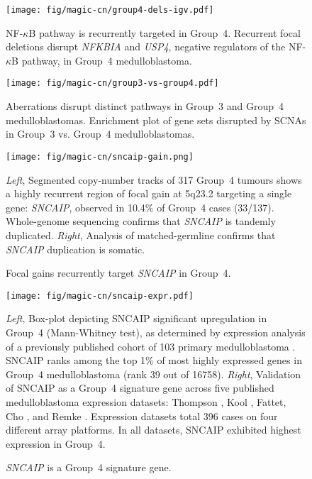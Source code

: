 \documentclass[11pt,letterpaper]{article}
\theoremstyle{definition}
\begin{document}
\clearpage

\begin{SCfigure}[2.0]
	\centering
	\texttt{[image: fig/magic-cn/group4-dels-igv.pdf]}
	\caption{NF-$\kappa$B pathway is recurrently targeted in Group~4.
		Recurrent focal deletions disrupt \emph{NFKBIA} and \emph{USP4}, negative regulators of the NF-$\kappa$B pathway, in Group~4 medulloblastoma.}
	\label{fig:group4-dels-igv}
\end{SCfigure}

\begin{SCfigure}
	\centering
	\texttt{[image: fig/magic-cn/group3-vs-group4.pdf]}
	\caption{Aberrations disrupt distinct pathways in Group~3 and Group~4 medulloblastomas.
	Enrichment plot of gene sets disrupted by SCNAs in Group~3 vs. Group~4 medulloblastomas.}
	\label{fig:group3-vs-group4}
\end{SCfigure}

\clearpage

\begin{figure}[h]
	\begin{center}
		\texttt{[image: fig/magic-cn/sncaip-gain.png]}
	\end{center}
	\caption{Focal gains recurrently target \emph{SNCAIP} in Group~4.}
	\emph{Left}, Segmented copy-number tracks of 317 Group~4 tumours shows a highly recurrent region of focal gain at 5q23.2 targeting a single gene: \emph{SNCAIP}, observed in 10.4\% of Group~4 cases (33/137). Whole-genome sequencing confirms that \emph{SNCAIP} is tandemly duplicated. \emph{Right}, Analysis of matched-germline confirms that \emph{SNCAIP} duplication is somatic.
	\label{fig:sncaip-gain}
\end{figure}

\begin{figure}[h]
	\begin{center}
		\texttt{[image: fig/magic-cn/sncaip-expr.pdf]}
	\end{center}
	\caption{\emph{SNCAIP} is a Group~4 signature gene.}
	\emph{Left}, Box-plot depicting SNCAIP significant upregulation in Group~4 (Mann-Whitney test), as determined by expression analysis of a previously published cohort of 103 primary medulloblastoma . SNCAIP ranks among the top 1\% of most highly expressed genes in Group~4 medulloblastoma (rank 39 out of 16758).
	\emph{Right}, Validation of SNCAIP as a Group~4 signature gene across five published medulloblastoma expression datasets: Thompson , Kool , Fattet, Cho , and Remke . Expression datasets total 396 cases on four different array platforms. In all datasets, SNCAIP exhibited highest expression in Group~4.
	\label{fig:sncaip-expr}
\end{figure}
\end{document}
